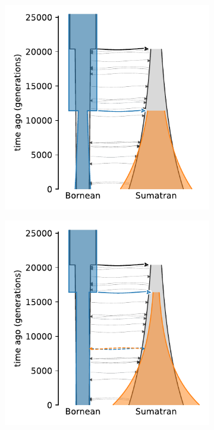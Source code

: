 \begin{figure}[ht]
    \centering
    \begin{subfigure}[b]{0.24\linewidth}
        \centering
        \includegraphics[width=\textwidth]{images_experiments/suimulation_2_stdpopsim/ORAN-PULSE/oran-nomig.pdf}
        \caption{}
    \end{subfigure}%
    \begin{subfigure}[b]{0.24\linewidth}
        \centering
        \includegraphics[width=\textwidth]{images_experiments/suimulation_2_stdpopsim/ORAN-PULSE/oran-pulse-1.pdf}

\end{subfigure}
\end{figure}
